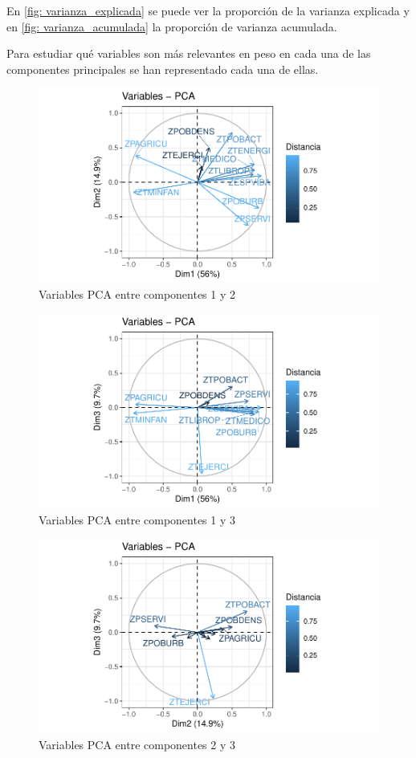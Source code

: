 \documentclass[twoside,openright,titlepage,numbers=noenddot,openany,headinclude,footinclude=true,
cleardoublepage=empty,abstractoff,BCOR=5mm,paper=a4,fontsize=12pt,main=spanish]{scrreprt}
\begin{document}
En \eqref{fig: varianza_explicada} se puede ver la proporción de la varianza explicada y en \eqref{fig: varianza_acumulada} la proporción de varianza acumulada.

Para estudiar qué variables son más relevantes en peso en cada una de las componentes principales se han representado cada una de ellas.

\begin{figure}[H]
\includegraphics[scale=1]{pca_12.pdf}
\caption{Variables PCA entre componentes 1 y 2}
\label{fig: pca_12}
\end{figure}

\begin{figure}[H]
\includegraphics[scale=1]{pca_13.pdf}
\caption{Variables PCA entre componentes 1 y 3}
\label{fig: pca_13}
\end{figure}

\begin{figure}[H]
\includegraphics[scale=1]{pca_23.pdf}
\caption{Variables PCA entre componentes 2 y 3}
\label{fig: pca_23}
\end{figure}
\end{document}
